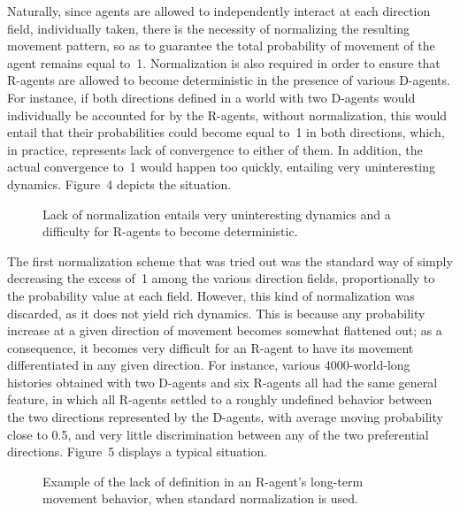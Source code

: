 \documentclass[11pt, a4paper]{article}
\begin{document}
Naturally, since agents are allowed to independently interact at each direction field, individually taken, there is the necessity of normalizing the resulting movement pattern, so as to guarantee the total probability of movement of the agent remains equal to~1. Normalization is also required in order to ensure that R-agents are allowed to become deterministic in the presence of various D-agents. For instance, if both directions defined in a world with two D-agents would individually be accounted for by the R-agents, without normalization, this would entail that their probabilities could become equal to~1 in both directions, which, in practice, represents lack of convergence to either of them. In addition, the actual convergence to~1 would happen too quickly, entailing very uninteresting dynamics. Figure~4 depicts the situation.

\begin{figure}[htbp]
\centering
{}
\caption{Lack of normalization entails very uninteresting dynamics and a difficulty for R-agents to become deterministic.}
\end{figure}

The first normalization scheme that was tried out was the standard way of simply decreasing the excess of~1 among the various direction fields, proportionally to the probability value at each field. However, this kind of normalization was discarded, as it does not yield rich dynamics. This is because any probability increase at a given direction of movement becomes somewhat flattened out; as a consequence, it becomes very difficult for an R-agent to have its movement differentiated in any given direction. For instance, various 4000-world-long histories obtained with two D-agents and six R-agents all had the same general feature, in which all R-agents settled to a roughly undefined behavior between the two directions represented by the D-agents, with average moving probability close to 0.5, and very little discrimination between any of the two preferential directions. Figure~5 displays a typical situation.

\begin{figure}[htbp]
\centering
{}
\caption{Example of the lack of definition in an R-agent's long-term movement behavior, when standard normalization is used.}
\end{figure}
\end{document}
